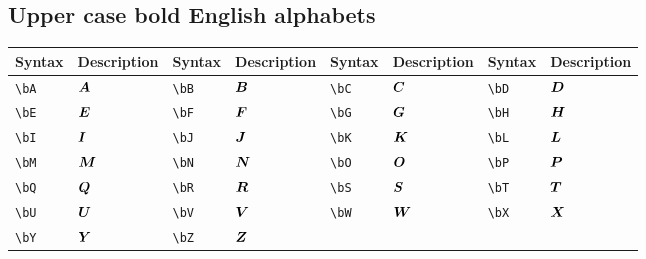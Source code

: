\documentclass{article}
\begin{document}
	\subsection{Upper case bold English alphabets}
	\begin{table}[H]
		\begin{tabular}{|l|l|l|l|l|l|l|l|}
			\hline
			Syntax	&	Description	&	Syntax	&	Description	&	Syntax	&	Description	&	Syntax	&	Description \\
			\hline
			\verb|\bA|	&	$\boldsymbol{A}$	&	\verb|\bB|	&	$\boldsymbol{B}$	&	\verb|\bC|	&	$\boldsymbol{C}$	&	\verb|\bD|	&	$\boldsymbol{D}$ \\
			\verb|\bE|	&	$\boldsymbol{E}$	&	\verb|\bF|	&	$\boldsymbol{F}$	&	\verb|\bG|	&	$\boldsymbol{G}$	&	\verb|\bH|	&	$\boldsymbol{H}$ \\
			\verb|\bI|	&	$\boldsymbol{I}$	&	\verb|\bJ|	&	$\boldsymbol{J}$	&	\verb|\bK|	&	$\boldsymbol{K}$	&	\verb|\bL|	&	$\boldsymbol{L}$ \\
			\verb|\bM|	&	$\boldsymbol{M}$	&	\verb|\bN|	&	$\boldsymbol{N}$	&	\verb|\bO|	&	$\boldsymbol{O}$	&	\verb|\bP|	&	$\boldsymbol{P}$ \\
			\verb|\bQ|	&	$\boldsymbol{Q}$	&	\verb|\bR|	&	$\boldsymbol{R}$	&	\verb|\bS|	&	$\boldsymbol{S}$	&	\verb|\bT|	&	$\boldsymbol{T}$ \\
			\verb|\bU|	&	$\boldsymbol{U}$	&	\verb|\bV|	&	$\boldsymbol{V}$	&	\verb|\bW|	&	$\boldsymbol{W}$	&	\verb|\bX|	&	$\boldsymbol{X}$ \\
			\verb|\bY|	&	$\boldsymbol{Y}$	&	\verb|\bZ|	&	$\boldsymbol{Z}$	&		&		&		&	 \\
			\hline	
		\end{tabular}
	\end{table}
\end{document}
